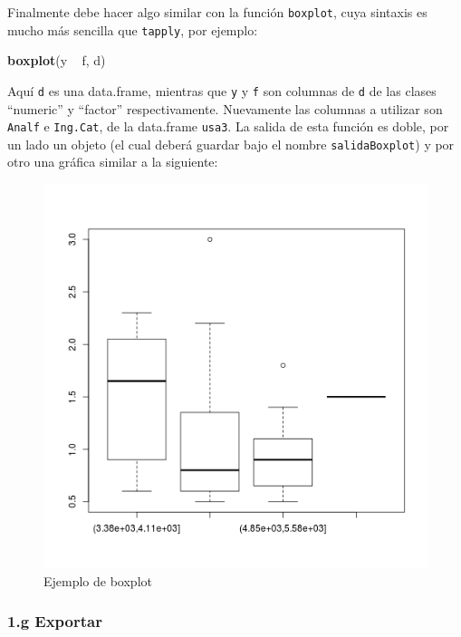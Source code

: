 \documentclass[]{article}
\makeatletter
\newenvironment{Shaded}{}{}
\newcommand{\KeywordTok}[1]{\textcolor[rgb]{0.00,0.44,0.13}{\textbf{{#1}}}}
\newcommand{\NormalTok}[1]{{#1}}
\def\maxwidth{\ifdim\Gin@nat@width>\linewidth\linewidth
\else\Gin@nat@width\fi}
\let\Oldincludegraphics\includegraphics
\renewcommand{\includegraphics}[1]{\Oldincludegraphics[width=\maxwidth]{#1}}
\makeatother
\begin{document}
Finalmente debe hacer algo similar con la función \texttt{boxplot}, cuya
sintaxis es mucho más sencilla que \texttt{tapply}, por ejemplo:

\begin{Shaded}
\begin{Highlighting}[]
\KeywordTok{boxplot}\NormalTok{(y ~ f, d)}
\end{Highlighting}
\end{Shaded}
Aquí \texttt{d} es una data.frame, mientras que \texttt{y} y \texttt{f}
son columnas de \texttt{d} de las clases ``numeric'' y ``factor''
respectivamente. Nuevamente las columnas a utilizar son \texttt{Analf} e
\texttt{Ing.Cat}, de la data.frame \texttt{usa3}. La salida de esta
función es doble, por un lado un objeto (el cual deberá guardar bajo el
nombre \texttt{salidaBoxplot}) y por otro una gráfica similar a la
siguiente:

\begin{figure}[htbp]
\centering
\includegraphics{figure/unnamed-chunk-15.png}
\caption{Ejemplo de boxplot}
\end{figure}

\subsubsection{1.g Exportar}
\end{document}

